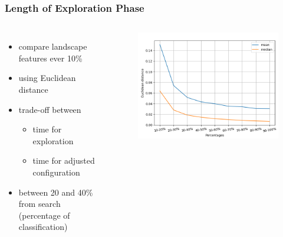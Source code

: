 \begin{frame}
	\frametitle{Length of Exploration Phase}
	
	\begin{columns}[c]
		

		\begin{itemize}
			\item compare landscape features ever 10\%
			\item using Euclidean distance
			\item trade-off between
				\begin{itemize}
					\item time for exploration
					\item time for adjusted configuration
				\end{itemize}
			\item between 20 and 40\% from search (percentage of classification)
		\end{itemize}
		
		\begin{figure}
			\includegraphics[width=1\textwidth]{figures/euclidean_distances}
		\end{figure}
		
		
	\end{columns}
	
\end{frame}

